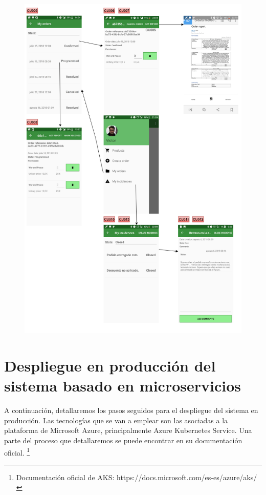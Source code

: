 \documentclass[11pt,spanish,listoffigures]{tfgetsinf}
\begin{document}
\begin{figure}[h]
\centering
\includegraphics[scale=0.8]{ModeloUI2}
\end{figure}

%

\chapter{Despliegue en producción del sistema basado en microservicios} \label{chap:Despliegue}

A continuación, detallaremos los pasos seguidos para el despliegue del sistema en producción. Las tecnologías que se van a emplear son las asociadas a la plataforma de Microsoft Azure, principalmente Azure Kubernetes Service. Una parte del proceso que detallaremos se puede encontrar en su documentación oficial. \footnote{ Documentación oficial de AKS: https://docs.microsoft.com/es-es/azure/aks/}
\end{document}

